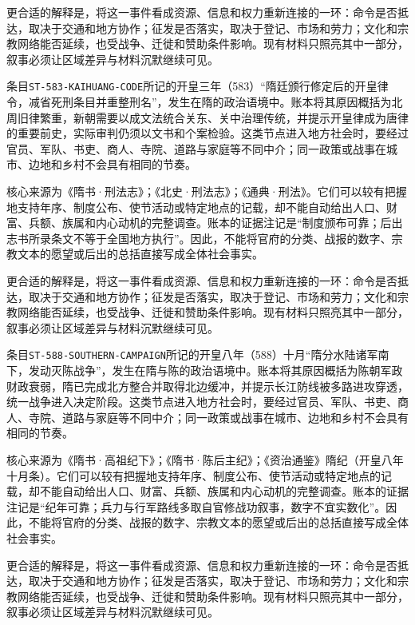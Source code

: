 更合适的解释是，将这一事件看成资源、信息和权力重新连接的一环：命令是否抵达，取决于交通和地方协作；征发是否落实，取决于登记、市场和劳力；文化和宗教网络能否延续，也受战争、迁徙和赞助条件影响。现有材料只照亮其中一部分，叙事必须让区域差异与材料沉默继续可见。


条目\texttt{ST-583-KAIHUANG-CODE}所记的开皇三年（583）“隋廷颁行修定后的开皇律令，减省死刑条目并重整刑名”，发生在隋的政治语境中。账本将其原因概括为北周旧律繁重，新朝需要以成文法统合关东、关中治理传统，并提示开皇律成为唐律的重要前史，实际审判仍须以文书和个案检验。这类节点进入地方社会时，要经过官员、军队、书吏、商人、寺院、道路与家庭等不同中介；同一政策或战事在城市、边地和乡村不会具有相同的节奏。

核心来源为《隋书·刑法志》；《北史·刑法志》；《通典·刑法》。它们可以较有把握地支持年序、制度公布、使节活动或特定地点的记载，却不能自动给出人口、财富、兵额、族属和内心动机的完整调查。账本的证据注记是“制度颁布可靠；后出志书所录条文不等于全国地方执行”。因此，不能将官府的分类、战报的数字、宗教文本的愿望或后出的总括直接写成全体社会事实。

更合适的解释是，将这一事件看成资源、信息和权力重新连接的一环：命令是否抵达，取决于交通和地方协作；征发是否落实，取决于登记、市场和劳力；文化和宗教网络能否延续，也受战争、迁徙和赞助条件影响。现有材料只照亮其中一部分，叙事必须让区域差异与材料沉默继续可见。


条目\texttt{ST-588-SOUTHERN-CAMPAIGN}所记的开皇八年（588）十月“隋分水陆诸军南下，发动灭陈战争”，发生在隋与陈的政治语境中。账本将其原因概括为陈朝军政财政衰弱，隋已完成北方整合并取得北边缓冲，并提示长江防线被多路进攻穿透，统一战争进入决定阶段。这类节点进入地方社会时，要经过官员、军队、书吏、商人、寺院、道路与家庭等不同中介；同一政策或战事在城市、边地和乡村不会具有相同的节奏。

核心来源为《隋书·高祖纪下》；《隋书·陈后主纪》；《资治通鉴》隋纪（开皇八年十月条）。它们可以较有把握地支持年序、制度公布、使节活动或特定地点的记载，却不能自动给出人口、财富、兵额、族属和内心动机的完整调查。账本的证据注记是“纪年可靠；兵力与行军路线多取自官修战功叙事，数字不宜实数化”。因此，不能将官府的分类、战报的数字、宗教文本的愿望或后出的总括直接写成全体社会事实。

更合适的解释是，将这一事件看成资源、信息和权力重新连接的一环：命令是否抵达，取决于交通和地方协作；征发是否落实，取决于登记、市场和劳力；文化和宗教网络能否延续，也受战争、迁徙和赞助条件影响。现有材料只照亮其中一部分，叙事必须让区域差异与材料沉默继续可见。

